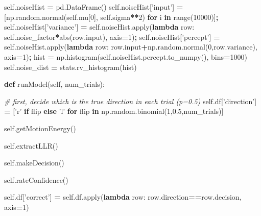 \documentclass[12pt,twoside]{reedthesis}
\newenvironment{Shaded}{\begin{snugshade}}{\end{snugshade}}
\newcommand{\BuiltInTok}[1]{#1}
\newcommand{\CommentTok}[1]{\textcolor[rgb]{0.56,0.35,0.01}{\textit{#1}}}
\newcommand{\ControlFlowTok}[1]{\textcolor[rgb]{0.13,0.29,0.53}{\textbf{#1}}}
\newcommand{\DecValTok}[1]{\textcolor[rgb]{0.00,0.00,0.81}{#1}}
\newcommand{\FloatTok}[1]{\textcolor[rgb]{0.00,0.00,0.81}{#1}}
\newcommand{\KeywordTok}[1]{\textcolor[rgb]{0.13,0.29,0.53}{\textbf{#1}}}
\newcommand{\NormalTok}[1]{#1}
\newcommand{\OperatorTok}[1]{\textcolor[rgb]{0.81,0.36,0.00}{\textbf{#1}}}
\newcommand{\StringTok}[1]{\textcolor[rgb]{0.31,0.60,0.02}{#1}}
\newcommand{\VariableTok}[1]{\textcolor[rgb]{0.00,0.00,0.00}{#1}}
\begin{document}
\begin{Shaded}
\begin{Highlighting}[]
        \VariableTok{self}\NormalTok{.noiseHist }\OperatorTok{=}\NormalTok{ pd.DataFrame()}
        \VariableTok{self}\NormalTok{.noiseHist[}\StringTok{'input'}\NormalTok{] }\OperatorTok{=}\NormalTok{ [np.random.normal(}\VariableTok{self}\NormalTok{.mu[}\DecValTok{0}\NormalTok{], }\VariableTok{self}\NormalTok{.sigma}\OperatorTok{**}\DecValTok{2}\NormalTok{) }\ControlFlowTok{for}\NormalTok{ i }\KeywordTok{in} \BuiltInTok{range}\NormalTok{(}\DecValTok{10000}\NormalTok{)]}\OperatorTok{;}
        \VariableTok{self}\NormalTok{.noiseHist[}\StringTok{'variance'}\NormalTok{] }\OperatorTok{=} \VariableTok{self}\NormalTok{.noiseHist.}\BuiltInTok{apply}\NormalTok{(}\KeywordTok{lambda}\NormalTok{ row: }\VariableTok{self}\NormalTok{.noise_factor}\OperatorTok{*}\BuiltInTok{abs}\NormalTok{(row.}\BuiltInTok{input}\NormalTok{), axis}\OperatorTok{=}\DecValTok{1}\NormalTok{)}\OperatorTok{;}
        \VariableTok{self}\NormalTok{.noiseHist[}\StringTok{'percept'}\NormalTok{] }\OperatorTok{=} \VariableTok{self}\NormalTok{.noiseHist.}\BuiltInTok{apply}\NormalTok{(}\KeywordTok{lambda}\NormalTok{ row: row.}\BuiltInTok{input}\OperatorTok{+}\NormalTok{np.random.normal(}\DecValTok{0}\NormalTok{,row.variance), axis}\OperatorTok{=}\DecValTok{1}\NormalTok{)}\OperatorTok{;}
\NormalTok{        hist }\OperatorTok{=}\NormalTok{ np.histogram(}\VariableTok{self}\NormalTok{.noiseHist.percept.to_numpy(), bins}\OperatorTok{=}\DecValTok{1000}\NormalTok{)}
        \VariableTok{self}\NormalTok{.noise_dist }\OperatorTok{=}\NormalTok{ stats.rv_histogram(hist)}
    
    \KeywordTok{def}\NormalTok{ runModel(}\VariableTok{self}\NormalTok{, num_trials):}

        \CommentTok{# first, decide which is the true direction in each trial (p=0.5)}
        \VariableTok{self}\NormalTok{.df[}\StringTok{'direction'}\NormalTok{] }\OperatorTok{=}\NormalTok{ [}\StringTok{'r'} \ControlFlowTok{if}\NormalTok{ flip }\ControlFlowTok{else} \StringTok{'l'} \ControlFlowTok{for}\NormalTok{ flip }\KeywordTok{in}\NormalTok{ np.random.binomial(}\DecValTok{1}\NormalTok{,}\FloatTok{0.5}\NormalTok{,num_trials)] }

        \VariableTok{self}\NormalTok{.getMotionEnergy()}
        
        \VariableTok{self}\NormalTok{.extractLLR()}

        \VariableTok{self}\NormalTok{.makeDecision()}

        \VariableTok{self}\NormalTok{.rateConfidence()}
        
        \VariableTok{self}\NormalTok{.df[}\StringTok{'correct'}\NormalTok{] }\OperatorTok{=} \VariableTok{self}\NormalTok{.df.}\BuiltInTok{apply}\NormalTok{(}\KeywordTok{lambda}\NormalTok{ row: row.direction}\OperatorTok{==}\NormalTok{row.decision, axis}\OperatorTok{=}\DecValTok{1}\NormalTok{)}
        

\end{Highlighting}
\end{Shaded}
\end{document}
